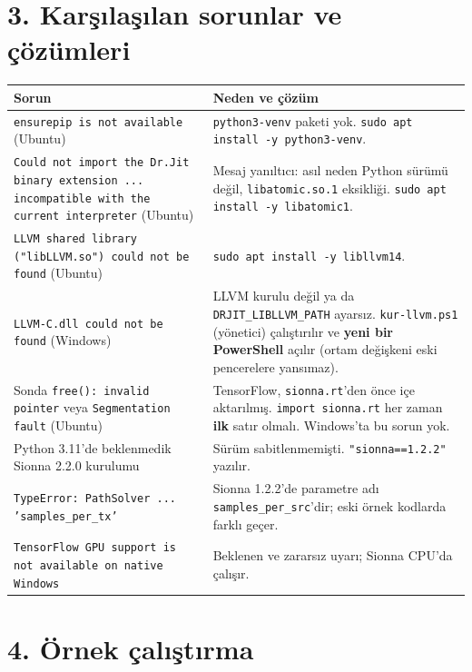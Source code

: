 \documentclass[10.5pt,a4paper]{article}
\begin{document}
\section*{3. Karşılaşılan sorunlar ve çözümleri}
\begingroup\sffamily\small
\begin{xltabular}{\textwidth}{@{}p{4.4cm}X@{}}
\toprule
\textbf{Sorun} & \textbf{Neden ve çözüm} \\
\midrule
\texttt{ensurepip is not available} (Ubuntu) & \texttt{python3-venv} paketi yok. \texttt{sudo apt install -y python3-venv}. \\
\texttt{Could not import the Dr.Jit binary extension ... incompatible with the current interpreter} (Ubuntu) & Mesaj yanıltıcı: asıl neden Python sürümü değil, \texttt{libatomic.so.1} eksikliği. \texttt{sudo apt install -y libatomic1}. \\
\texttt{LLVM shared library ("libLLVM.so") could not be found} (Ubuntu) & \texttt{sudo apt install -y libllvm14}. \\
\texttt{LLVM-C.dll could not be found} (Windows) & LLVM kurulu değil ya da \texttt{DRJIT\_LIBLLVM\_PATH} ayarsız. \texttt{kur-llvm.ps1} (yönetici) çalıştırılır ve \textbf{yeni bir PowerShell} açılır (ortam değişkeni eski pencerelere yansımaz). \\
Sonda \texttt{free(): invalid pointer} veya \texttt{Segmentation fault} (Ubuntu) & TensorFlow, \texttt{sionna.rt}'den önce içe aktarılmış. \texttt{import sionna.rt} her zaman \textbf{ilk} satır olmalı. Windows'ta bu sorun yok. \\
Python 3.11'de beklenmedik Sionna 2.2.0 kurulumu & Sürüm sabitlenmemişti. \texttt{"sionna==1.2.2"} yazılır. \\
\texttt{TypeError: PathSolver ... 'samples\_per\_tx'} & Sionna 1.2.2'de parametre adı \texttt{samples\_per\_src}'dir; eski örnek kodlarda farklı geçer. \\
\texttt{TensorFlow GPU support is not available on native Windows} & Beklenen ve zararsız uyarı; Sionna CPU'da çalışır. \\
\bottomrule
\end{xltabular}
\endgroup

\section*{4. Örnek çalıştırma}
\end{document}

